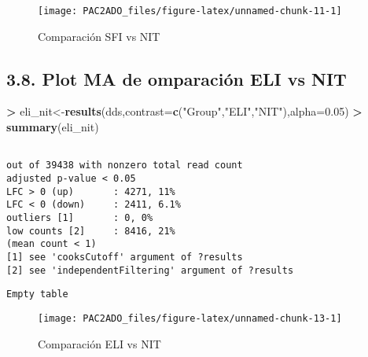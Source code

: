 \documentclass[
]{article}
\newenvironment{Shaded}{\begin{snugshade}}{\end{snugshade}}
\newcommand{\DataTypeTok}[1]{\textcolor[rgb]{0.13,0.29,0.53}{#1}}
\newcommand{\FloatTok}[1]{\textcolor[rgb]{0.00,0.00,0.81}{#1}}
\newcommand{\KeywordTok}[1]{\textcolor[rgb]{0.13,0.29,0.53}{\textbf{#1}}}
\newcommand{\NormalTok}[1]{#1}
\newcommand{\OperatorTok}[1]{\textcolor[rgb]{0.81,0.36,0.00}{\textbf{#1}}}
\newcommand{\StringTok}[1]{\textcolor[rgb]{0.31,0.60,0.02}{#1}}
\begin{document}
\begin{figure}

{\centering \texttt{[image: PAC2ADO\_files/figure-latex/unnamed-chunk-11-1]} 

}

\caption{Comparación SFI vs NIT}\label{fig:unnamed-chunk-11}
\end{figure}

\hypertarget{plot-ma-de-omparaciuxf3n-eli-vs-nit}{%
\subsection{3.8. Plot MA de omparación ELI vs
NIT}\label{plot-ma-de-omparaciuxf3n-eli-vs-nit}}

\begin{Shaded}
\begin{Highlighting}[]
\OperatorTok{>}\StringTok{ }\NormalTok{eli_nit<-}\KeywordTok{results}\NormalTok{(dds,}\DataTypeTok{contrast=}\KeywordTok{c}\NormalTok{(}\StringTok{"Group"}\NormalTok{,}\StringTok{"ELI"}\NormalTok{,}\StringTok{"NIT"}\NormalTok{),}\DataTypeTok{alpha=}\FloatTok{0.05}\NormalTok{)}
\OperatorTok{>}\StringTok{ }\KeywordTok{summary}\NormalTok{(eli_nit)}
\end{Highlighting}
\end{Shaded}

\begin{verbatim}

out of 39438 with nonzero total read count
adjusted p-value < 0.05
LFC > 0 (up)       : 4271, 11%
LFC < 0 (down)     : 2411, 6.1%
outliers [1]       : 0, 0%
low counts [2]     : 8416, 21%
(mean count < 1)
[1] see 'cooksCutoff' argument of ?results
[2] see 'independentFiltering' argument of ?results
\end{verbatim}

\begin{Shaded}
\end{Shaded}

\begin{verbatim}
Empty table
\end{verbatim}

\begin{figure}

{\centering \texttt{[image: PAC2ADO\_files/figure-latex/unnamed-chunk-13-1]} 

}

\caption{Comparación ELI vs NIT}\label{fig:unnamed-chunk-13}
\end{figure}
\end{document}
